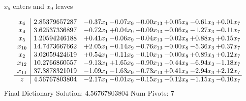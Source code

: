 \documentclass[9pt]{article}
\begin{document}
 $ x_{5} $ enters and $ x_{9} $ leaves 

 \[\begin{array}{c| c c@{\hskip 2pt} c@{\hskip 2pt} c@{\hskip 2pt} c@{\hskip 2pt} c@{\hskip 2pt} c@{\hskip 2pt} }
 x_{6}   &  2.85379657287 & -0.37 x_{1} & -0.07 x_{9} & +  0.00 x_{13} & +  0.05 x_{8} & -0.61 x_{3} & +  0.01 x_{7}\\
 x_{4}   &  3.62537336897 & -0.72 x_{1} & +  0.04 x_{9} & +  0.09 x_{13} & -0.06 x_{8} & -1.27 x_{3} & -0.11 x_{7}\\
 x_{5}   &  1.20594246188 & +  0.41 x_{1} & -0.06 x_{9} & -0.04 x_{13} & -0.02 x_{8} & +  0.88 x_{3} & +  0.15 x_{7}\\
 x_{10}   &  14.7473667662 & +  2.05 x_{1} & -0.14 x_{9} & +  0.76 x_{13} & -0.00 x_{8} & -5.36 x_{3} & +  0.37 x_{7}\\
 x_{2}   &  3.02059424619 & +  0.54 x_{1} & -0.11 x_{9} & -0.10 x_{13} & -0.00 x_{8} & +  0.89 x_{3} & +  0.12 x_{7}\\
 x_{12}   &  10.2766860557 & -9.13 x_{1} & +  1.65 x_{9} & +  0.90 x_{13} & -0.44 x_{8} & -6.94 x_{3} & -1.18 x_{7}\\
 x_{11}   &  37.3878321019 & -1.09 x_{1} & -1.63 x_{9} & -0.73 x_{13} & +  0.41 x_{8} & -2.94 x_{3} & +  2.12 x_{7}\\
\hline
z    &  4.56767803804 & -2.17 x_{1} & -0.01 x_{9} & -0.15 x_{13} & -0.12 x_{8} & -1.15 x_{3} & -0.10 x_{7}\\
\end{array}\]
Final Dictionary
Solution:  4.56767803804
Num Pivots:  7
\end{document}
